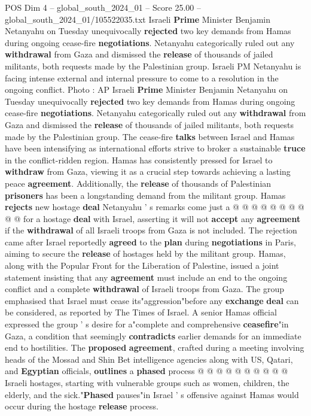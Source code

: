 \begin{textsample}{POS Dim 4 – global\_south\_2024\_01 – Score 25.00 – global\_south\_2024\_01/105522035.txt}  \label{ex:f4_pos_371}
Israeli \textbf{Prime} Minister Benjamin Netanyahu on Tuesday unequivocally \textbf{rejected} two key demands from Hamas during ongoing cease-fire \textbf{negotiations}.
Netanyahu categorically ruled out any \textbf{withdrawal} from Gaza and dismissed the \textbf{release} of thousands of jailed militants, both requests made by the Palestinian group.
Israeli PM Netanyahu is facing intense external and internal pressure to come to a resolution in the ongoing conflict.
Photo : AP Israeli \textbf{Prime} Minister Benjamin Netanyahu on Tuesday unequivocally \textbf{rejected} two key demands from Hamas during ongoing cease-fire \textbf{negotiations}.
Netanyahu categorically ruled out any \textbf{withdrawal} from Gaza and dismissed the \textbf{release} of thousands of jailed militants, both requests made by the Palestinian group.
The cease-fire \textbf{talks} between Israel and Hamas have been intensifying as international efforts strive to broker a sustainable \textbf{truce} in the conflict-ridden region.
Hamas has consistently pressed for Israel to \textbf{withdraw} from Gaza, viewing it as a crucial step towards achieving a lasting peace \textbf{agreement}.
Additionally, the \textbf{release} of thousands of Palestinian \textbf{prisoners} has been a longstanding demand from the militant group.
Hamas \textbf{rejects} new hostage \textbf{deal} Netanyahu ' s remarks come just a @ @ @ @ @ @ @ @ @ @ for a hostage \textbf{deal} with Israel, asserting it will not \textbf{accept} any \textbf{agreement} if the \textbf{withdrawal} of all Israeli troops from Gaza is not included.
The rejection came after Israel reportedly \textbf{agreed} to the \textbf{plan} during \textbf{negotiations} in Paris, aiming to secure the \textbf{release} of hostages held by the militant group.
Hamas, along with the Popular Front for the Liberation of Palestine, issued a joint statement insisting that any \textbf{agreement} must include an end to the ongoing conflict and a complete \textbf{withdrawal} of Israeli troops from Gaza.
The group emphasised that Israel must cease its"aggression"before any \textbf{exchange} \textbf{deal} can be considered, as reported by The Times of Israel.
A senior Hamas official expressed the group ' s desire for a"complete and comprehensive \textbf{ceasefire}"in Gaza, a condition that seemingly \textbf{contradicts} earlier demands for an immediate end to hostilities.
The \textbf{proposed} \textbf{agreement}, crafted during a meeting involving heads of the Mossad and Shin Bet intelligence agencies along with US, Qatari, and \textbf{Egyptian} officials, \textbf{outlines} a \textbf{phased} process @ @ @ @ @ @ @ @ @ @ Israeli hostages, starting with vulnerable groups such as women, children, the elderly, and the sick."\textbf{Phased} pauses"in Israel ' s offensive against Hamas would occur during the hostage \textbf{release} process.

\end{textsample}
